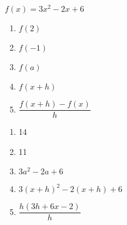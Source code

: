 {$f(x)=3x^2-2x+6$\\
\begin{minipage}{.5\linewidth}
\begin{enumerate}
\item $f(2)$
\item $f(-1)$
\item $f(a)$
\end{enumerate}
\end{minipage}%
\begin{minipage}{.5\linewidth}
\begin{enumerate}
\setcounter{enumi}{3}
\item $f(x+h)$
\item $\dfrac{f(x+h)-f(x)}{h}$
\end{enumerate}
\end{minipage}}
{\begin{enumerate}
\item 14
\item 11
\item $3a^2-2a+6$
\item $3(x+h)^2-2(x+h)+6$
\item $\dfrac{h(3 h+6 x-2)}h$
\end{enumerate}}
